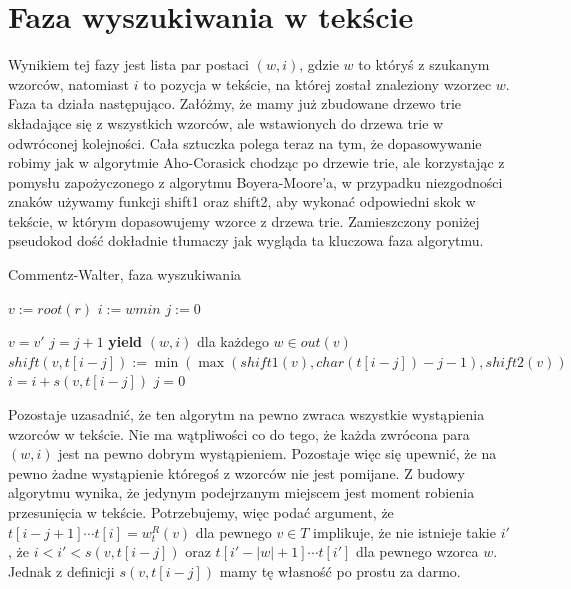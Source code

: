\documentclass[a4paper,11pt]{article}
\begin{document}
\section{Faza wyszukiwania w tekście}
Wynikiem tej fazy jest lista par postaci $(w, i)$, gdzie $w$ to któryś z szukanym wzorców, natomiast $i$ to pozycja w tekście, na której został znaleziony wzorzec $w$. Faza ta działa następująco. Załóżmy, że mamy już zbudowane drzewo trie składające się z wszystkich wzorców, ale wstawionych do drzewa trie w odwróconej kolejności. Cała sztuczka polega teraz na tym, że dopasowywanie robimy jak w algorytmie Aho-Corasick chodząc po drzewie trie, ale korzystając z pomysłu zapożyczonego z algorytmu Boyera-Moore'a, w przypadku niezgodności znaków używamy funkcji shift1 oraz shift2, aby wykonać odpowiedni skok w tekście, w którym dopasowujemy wzorce z drzewa trie. Zamieszczony poniżej pseudokod dość dokładnie tłumaczy jak wygląda ta kluczowa faza algorytmu.

\begin{algorithm}
\caption{Commentz-Walter, faza wyszukiwania}\label{euclid}
\begin{algorithmic}[1]
 
\State $v := root(r)$ 
\State $i := wmin$ 
\State $j := 0$ 

     
        \State $v = v'$
        \State $j = j + 1$
        \State \textbf{yield} $(w, i)$ dla każdego $w \in out(v)$
    \EndWhile
\State $shift(v, t[i-j]) := \min(\max(shift1(v), char(t[i-j])-j-1), shift2(v))$
\State $i = i + s(v, t[i-j])$ 
\State $j = 0$
\EndWhile
\EndProcedure
\end{algorithmic}
\end{algorithm}

Pozostaje uzasadnić, że ten algorytm na pewno zwraca wszystkie wystąpienia wzorców w tekście. Nie ma wątpliwości co do tego, że każda zwrócona para $(w, i)$ jest na pewno dobrym wystąpieniem. Pozostaje więc się upewnić, że na pewno żadne wystąpienie któregoś z wzorców nie jest pomijane. Z budowy algorytmu wynika, że jedynym podejrzanym miejscem jest moment robienia przesunięcia w tekście. Potrzebujemy, więc podać argument, że $t[i-j+1]\cdots t[i] = w_t^R(v)$ dla pewnego $v \in T$ implikuje, że nie istnieje takie $i'$, że $i < i' < s(v, t[i-j])$ oraz $t[i'-|w|+1]\cdots t[i']$ dla pewnego wzorca $w$. Jednak z definicji $s(v, t[i-j])$ mamy tę własność po prostu za darmo.
\end{document}
